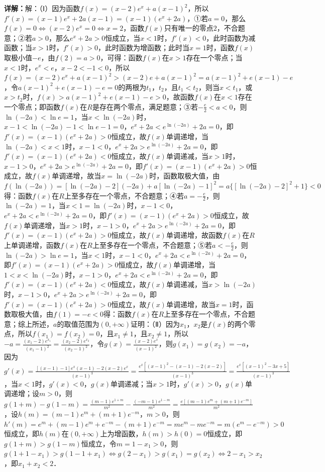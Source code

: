 \begin{question}[points=12]
\begin{solution}
\textbf{详解：}解：（Ⅰ）因为函数$f(x)=(x-2)e^x+a(x-1)^2$，所以$f'(x)=(x-1)e^x+2a(x-1)=(x-1)(e^x+2a)$，①若$a=0$，那么$f(x)=0\Leftrightarrow(x-2)e^x=0\Leftrightarrow x=2$，函数$f(x)$只有唯一的零点$2$，不合题意；②若$a>0$，那么$e^x+2a>0$恒成立，当$x<1$时，$f'(x)<0$，此时函数为减函数；当$x>1$时，$f'(x)>0$，此时函数为增函数；此时当$x=1$时，函数$f(x)$取极小值$-e$，由$f(2)=a>0$，可得：函数$f(x)$在$x>1$存在一个零点；当$x<1$时，$e^x<e$，$x-2<-1<0$，所以$f(x)=(x-2)e^x+a(x-1)^2>(x-2)e+a(x-1)^2=a(x-1)^2+e(x-1)-e$，令$a(x-1)^2+e(x-1)-e=0$的两根为$t_1$，$t_2$，且$t_1<t_2$，则当$x<t_1$，或$x>t_2$时，$f(x)>a(x-1)^2+e(x-1)-e>0$，故函数$f(x)$在$x<1$存在一个零点；即函数$f(x)$在$R$是存在两个零点，满足题意；③若$-\frac{e}{2}<a<0$，则$\ln(-2a)<\ln e=1$，当$x<\ln(-2a)$时，$x-1<\ln(-2a)-1<\ln e-1=0$，$e^x+2a<e^{\ln(-2a)}+2a=0$，即$f'(x)=(x-1)(e^x+2a)>0$恒成立，故$f(x)$单调递增，当$\ln(-2a)<x<1$时，$x-1<0$，$e^x+2a>e^{\ln(-2a)}+2a=0$，即$f'(x)=(x-1)(e^x+2a)<0$恒成立，故$f(x)$单调递减，当$x>1$时，$x-1>0$，$e^x+2a>e^{\ln(-2a)}+2a=0$，即$f'(x)=(x-1)(e^x+2a)>0$恒成立，故$f(x)$单调递增，故当$x=\ln(-2a)$时，函数取极大值，由$f(\ln(-2a))=[\ln(-2a)-2](-2a)+a[\ln(-2a)-1]^2=a\{[\ln(-2a)-2]^2+1\}<0$得：函数$f(x)$在$R$上至多存在一个零点，不合题意；④若$a=-\frac{e}{2}$，则$\ln(-2a)=1$，当$x<1=\ln(-2a)$时，$x-1<0$，$e^x+2a<e^{\ln(-2a)}+2a=0$，即$f'(x)=(x-1)(e^x+2a)>0$恒成立，故$f(x)$单调递增，当$x>1$时，$x-1>0$，$e^x+2a>e^{\ln(-2a)}+2a=0$，即$f'(x)=(x-1)(e^x+2a)>0$恒成立，故$f(x)$单调递增，故函数$f(x)$在$R$上单调递增，函数$f(x)$在$R$上至多存在一个零点，不合题意；⑤若$a<-\frac{e}{2}$，则$\ln(-2a)>\ln e=1$，当$x<1$时，$x-1<0$，$e^x+2a<e^{\ln(-2a)}+2a=0$，即$f'(x)=(x-1)(e^x+2a)>0$恒成立，故$f(x)$单调递增，当$1<x<\ln(-2a)$时，$x-1>0$，$e^x+2a<e^{\ln(-2a)}+2a=0$，即$f'(x)=(x-1)(e^x+2a)<0$恒成立，故$f(x)$单调递减，当$x>\ln(-2a)$时，$x-1>0$，$e^x+2a>e^{\ln(-2a)}+2a=0$，即$f'(x)=(x-1)(e^x+2a)>0$恒成立，故$f(x)$单调递增，故当$x=1$时，函数取极大值，由$f(1)=-e<0$得：函数$f(x)$在$R$上至多存在一个零点，不合题意；综上所述，$a$的取值范围为$(0,+\infty)$证明：（Ⅱ）因为$x_1$，$x_2$是$f(x)$的两个零点，所以$f(x_1)=f(x_2)=0$，且$x_1\neq1$，且$x_2\neq1$，所以$-a=\frac{(x_1-2)e^{x_1}}{(x_1-1)^2}=\frac{(x_2-2)e^{x_2}}{(x_2-1)^2}$，令$g(x)=\frac{(x-2)e^x}{(x-1)^2}$，则$g(x_1)=g(x_2)=-a$，因为$g'(x)=\frac{[(x-1)-1]e^x(x-1)-2(x-2)e^x}{(x-1)^3}=\frac{e^x[(x-1)^2- (x-1)-2(x-2)]}{(x-1)^3}=\frac{e^x[(x-1)^2-3x+5]}{(x-1)^3}$，当$x<1$时，$g'(x)<0$，$g(x)$单调递减；当$x>1$时，$g'(x)>0$，$g(x)$单调递增；设$m>0$，则$g(1+m)-g(1-m)=\frac{(m-1)e^{1+m}}{m^2}-\frac{(-m-1)e^{1-m}}{m^2}=\frac{e[(m-1)e^m+(m+1)e^{-m}]}{m^2}$，设$h(m)= (m-1)e^m+(m+1)e^{-m}$，$m>0$，则$h'(m)= e^m+(m-1)e^m + e^{-m}-(m+1)e^{-m}= me^m - me^{-m}= m(e^m - e^{-m})>0$恒成立，即$h(m)$在$(0,+\infty)$上为增函数，$h(m)>h(0)=0$恒成立，即$g(1+m)>g(1-m)$恒成立，令$m=1-x_1>0$，则$g(1+1-x_1)>g(1-1+x_1)\Leftrightarrow g(2-x_1)>g(x_1)=g(x_2)\Leftrightarrow 2-x_1>x_2$，即$x_1+x_2<2$．
\end{solution}
\end{question}


